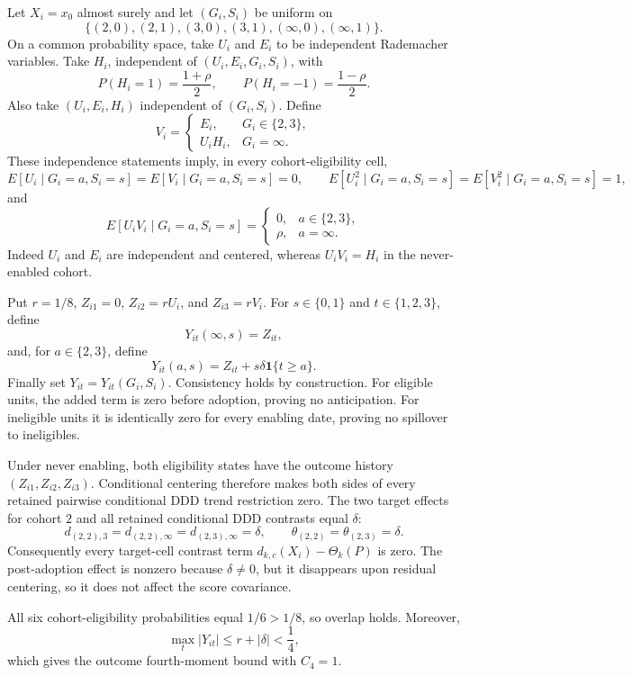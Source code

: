 Let \(X_i=x_0\) almost surely and let \((G_i,S_i)\) be uniform on
\[
 \{(2,0),(2,1),(3,0),(3,1),(\infty,0),(\infty,1)\}.
\]
On a common probability space, take \(U_i\) and \(E_i\) to be independent Rademacher variables. Take \(H_i\), independent of \((U_i,E_i,G_i,S_i)\), with
\[
 P(H_i=1)=\frac{1+\rho}{2},
 \qquad
 P(H_i=-1)=\frac{1-\rho}{2}.
\]
Also take \((U_i,E_i,H_i)\) independent of \((G_i,S_i)\). Define
\[
 V_i=
 \begin{cases}
 E_i,&G_i\in\{2,3\},\\
 U_iH_i,&G_i=\infty.
 \end{cases}
\]
These independence statements imply, in every cohort-eligibility cell,
\[
 E[U_i\mid G_i=a,S_i=s]=E[V_i\mid G_i=a,S_i=s]=0,
 \qquad
 E[U_i^2\mid G_i=a,S_i=s]=E[V_i^2\mid G_i=a,S_i=s]=1,
\]
and
\[
 E[U_iV_i\mid G_i=a,S_i=s]
 =\begin{cases}
 0,&a\in\{2,3\},\\
 \rho,&a=\infty.
 \end{cases}
\]
Indeed \(U_i\) and \(E_i\) are independent and centered, whereas \(U_iV_i=H_i\) in the never-enabled cohort.

Put \(r=1/8\), \(Z_{i1}=0\), \(Z_{i2}=rU_i\), and \(Z_{i3}=rV_i\). For \(s\in\{0,1\}\) and \(t\in\{1,2,3\}\), define
\[
 Y_{it}(\infty,s)=Z_{it},
\]
and, for \(a\in\{2,3\}\), define
\[
 Y_{it}(a,s)=Z_{it}+s\delta\mathbf 1\{t\ge a\}.
\]
Finally set \(Y_{it}=Y_{it}(G_i,S_i)\). Consistency holds by construction. For eligible units, the added term is zero before adoption, proving no anticipation. For ineligible units it is identically zero for every enabling date, proving no spillover to ineligibles.

Under never enabling, both eligibility states have the outcome history \((Z_{i1},Z_{i2},Z_{i3})\). Conditional centering therefore makes both sides of every retained pairwise conditional DDD trend restriction zero. The two target effects for cohort \(2\) and all retained conditional DDD contrasts equal \(\delta\):
\[
 d_{(2,2),3}=d_{(2,2),\infty}
 =d_{(2,3),\infty}=\delta,
 \qquad
 \theta_{(2,2)}=\theta_{(2,3)}=\delta.
\]
Consequently every target-cell contrast term \(d_{k,c}(X_i)-\Theta_k(P)\) is zero. The post-adoption effect is nonzero because \(\delta\ne0\), but it disappears upon residual centering, so it does not affect the score covariance.

All six cohort-eligibility probabilities equal \(1/6>1/8\), so overlap holds. Moreover,
\[
 \max_t|Y_{it}|\le r+|\delta|<\frac14,
\]
which gives the outcome fourth-moment bound with \(C_4=1\).

